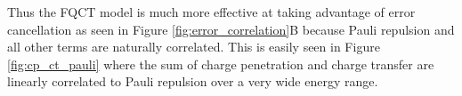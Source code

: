 \documentclass[journal=jctcce,manuscript=article]{achemso}
\begin{document}
Thus the FQCT model is much more effective at taking advantage of error cancellation as seen in Figure \ref{fig:error_correlation}B because Pauli repulsion and all other terms are naturally correlated. This is easily seen in Figure \ref{fig:cp_ct_pauli} where the sum of charge penetration and charge transfer are linearly correlated to Pauli repulsion over a very wide energy range. %
\end{document}
